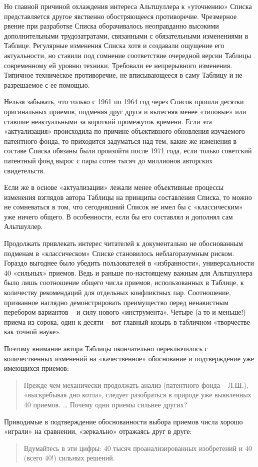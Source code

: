 \documentclass[11pt,a4paper]{article}
\begin{document}
Но главной причиной охлаждения интереса Альтшуллера к «уточнению» Списка
представляется другое явственно обостряющееся противоречие. Чрезмерное рвение
при разработке Списка оборачивалось неоправданно высокими дополнительными
трудозатратами, связанными с обязательными изменениями в Таблице. Регулярные
изменения Списка хотя и создавали ощущение его актуальности, но ставили под
сомнение соответствие очередной версии Таблицы современному ей уровню техники.
Требовали ее непрерывного изменения. Типичное техническое противоречие, не
вписывающееся в саму Таблицу и не разрешаемое с ее помощью.

Нельзя забывать, что только с 1961 по 1964 год через Список прошли десятки
оригинальных приемов, подменяя друг друга и вытесняя менее «типовые» или
ставшие неактуальными за короткий промежуток времени. Если эта «актуализация»
происходила по причине объективного обновления изучаемого патентного фонда, то
приходится задуматься над тем, какие же изменения в составе Списка обязаны
были произойти после 1971 года, если только советский патентный фонд вырос с
пары сотен тысяч до миллионов авторских свидетельств.

Если же в основе «актуализации» лежали менее объективные процессы изменения
взглядов автора Таблицы на принципы составления Списка, то можно не
сомневаться в том, что сегодняшний Список не имел бы с «классическим» уже
ничего общего. В особенности, если бы его составлял и дополнял сам Альтшуллер.

Продолжать привлекать интерес читателей к документально не обоснованным
подменам в «классическом» Списке становилось неблагоразумным риском. Гораздо
выгоднее было убедить пользователей в «избранности», универсальности 40
«сильных» приемов. Ведь и раньше по-настоящему важным для Альтшуллера было
лишь соотношение общего числа приемов, использованных в Таблице, к количеству
рекомендаций для отдельных конфликтных пар. Соотношение, призванное наглядно
демонстрировать преимущество перед ненавистным перебором вариантов -- и силу
нового «инструмента». Четыре (а то и меньше!) приема из сорока, один к десяти
-- вот главный козырь в табличном «творчестве как точной науке».

Поэтому внимание автора Таблицы окончательно переключилось с количественных
изменений на «качественное» обоснование и подтверждение уже имеющихся приемов:
\begin{quote}
  Прежде чем механически продолжать анализ (патентного фонда -- Л.Ш.),
  «выскребывая дно котла», следует разобраться в природе уже выявленных 40
  приемов.  … Почему одни приемы сильнее других? \cite[с. 98]{Altshuller1979}
\end{quote}
Приводимые в подтверждение обоснованности выбора приемов числа хорошо «играли»
на сравнении, «зеркально» отражаясь друг в друге:
\begin{quote}
  Вдумайтесь в эти цифры: 40 тысяч проанализированных изобретений и 40 (всего
  40!) сильных решений.
\end{quote}
\end{document}
